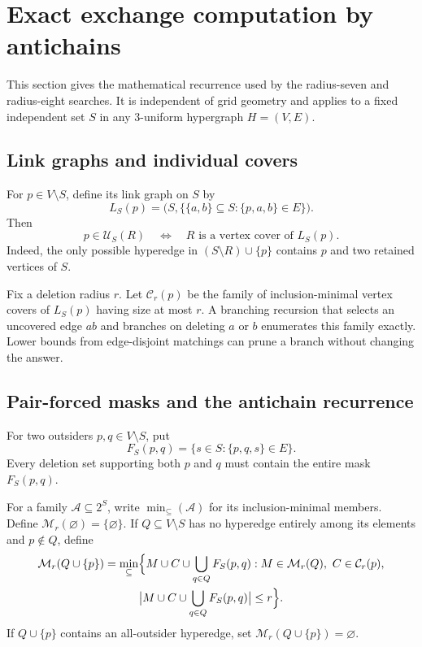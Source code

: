\documentclass[11pt]{article}
\theoremstyle{definition}
\theoremstyle{remark}
\newcommand{\calU}{\mathcal{U}}
\newcommand{\calC}{\mathcal{C}}
\newcommand{\calM}{\mathcal{M}}
\begin{document}
\section{Exact exchange computation by antichains}
\label{sec:algorithm}

This section gives the mathematical recurrence used by the radius-seven and
radius-eight searches.  It is independent of grid geometry and applies to a fixed independent
set $S$ in any $3$-uniform hypergraph $H=(V,E)$.

\subsection{Link graphs and individual covers}

For $p\in V\setminus S$, define its link graph on $S$ by
\[
  L_S(p)=\bigl(S,\{\{a,b\}\subseteq S:\{p,a,b\}\in E\}\bigr).
\]
Then
\begin{equation}
 p\in\calU_S(R)
 \quad\Longleftrightarrow\quad
 R\text{ is a vertex cover of }L_S(p).
 \label{eq:link-cover}
\end{equation}
Indeed, the only possible hyperedge in $(S\setminus R)\cup\{p\}$ contains
$p$ and two retained vertices of $S$.

Fix a deletion radius $r$.  Let $\calC_r(p)$ be the family of
inclusion-minimal vertex covers of $L_S(p)$ having size at most $r$.  A
branching recursion that selects an uncovered edge $ab$ and branches on
deleting $a$ or $b$ enumerates this family exactly.  Lower bounds from
edge-disjoint matchings can prune a branch without changing the answer.

\subsection{Pair-forced masks and the antichain recurrence}

For two outsiders $p,q\in V\setminus S$, put
\[
  F_S(p,q)=\{s\in S:\{p,q,s\}\in E\}.
\]
Every deletion set supporting both $p$ and $q$ must contain the entire mask
$F_S(p,q)$.

For a family $\mathcal A\subseteq2^S$, write
$\min_{\subseteq}(\mathcal A)$ for its inclusion-minimal members.  Define
$\calM_r(\varnothing)=\{\varnothing\}$.  If $Q\subseteq V\setminus S$ has no
hyperedge entirely among its elements and $p\notin Q$, define
\begin{multline}
 \calM_r(Q\cup\{p\})=\min_{\subseteq}\Bigl\{
 M\cup C\cup\bigcup_{q\in Q}F_S(p,q):
 M\in\calM_r(Q),\ C\in\calC_r(p),\\
 \bigl|M\cup C\cup\bigcup_{q\in Q}F_S(p,q)\bigr|\le r
 \Bigr\}.
 \label{eq:antichain-recurrence}
\end{multline}
If $Q\cup\{p\}$ contains an all-outsider hyperedge, set
$\calM_r(Q\cup\{p\})=\varnothing$.
\end{document}
